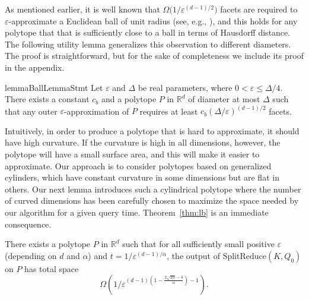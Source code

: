 \documentclass[11pt]{article}   \usepackage[letterpaper,hmargin=2.1cm,vmargin=3cm]{geometry}
\newcommand{\RE}{\mathbb{R}}    \newcommand{\ZZ}{\mathbb{Z}}    \newcommand{\eps}{\varepsilon}  \newcommand{\ST}{\,:\,}         \newcommand{\sq}{\square}
\newcommand{\alg}{\textrm{SplitReduce}}
\begin{document}
As mentioned earlier, it is well known that $\Omega\big(1/\eps^{(d-1)/2}\big)$ facets are required to $\eps$-approximate a Euclidean ball of unit radius (see, e.g., \cite{Bro08}), and this holds for any polytope that that is sufficiently close to a ball in terms of Hausdorff distance. The following utility lemma generalizes this observation to different diameters. The proof is straightforward, but for the sake of completeness we include its proof in the appendix.

\begin{restatable}{lemma}{BallLemmaStmt}\label{lem:ball}
Let $\eps$ and $\Delta$ be real parameters, where $0 < \eps \le \Delta/4$. There exists a constant $c_b$ and a polytope $P$ in $\RE^d$ of diameter at most $\Delta$ such that any outer $\eps$-approximation of $P$ requires at least $c_b (\Delta / \eps)^{(d-1)/2}$ facets.
\end{restatable}


Intuitively, in order to produce a polytope that is hard to approximate, it should have high curvature. If the curvature is high in all dimensions, however, the polytope will have a small surface area, and this will make it easier to approximate. Our approach is to consider polytopes based on generalized cylinders, which have constant curvature in some dimensions but are flat in others. Our next lemma introduces such a cylindrical polytope where the number of curved dimensions has been carefully chosen to maximize the space needed by our algorithm for a given query time. Theorem~\ref{thm:lb} is an immediate consequence.

\begin{lemma} \label{lem:cyl}
There exists a polytope $P$ in $\RE^d$ such that for all sufficiently small positive $\eps$ (depending on $d$ and $\alpha$) and  $t = 1/\eps^{(d-1)/\alpha}$, the output of $\alg(K,Q_0)$ on $P$ has total space
\[
	\Omega\left(1/\eps^{(d-1) \left(1 - \frac{2\sqrt{2\alpha} - 3}{\alpha}\right) - 1} \right).
\]
\end{lemma}
\end{document}
